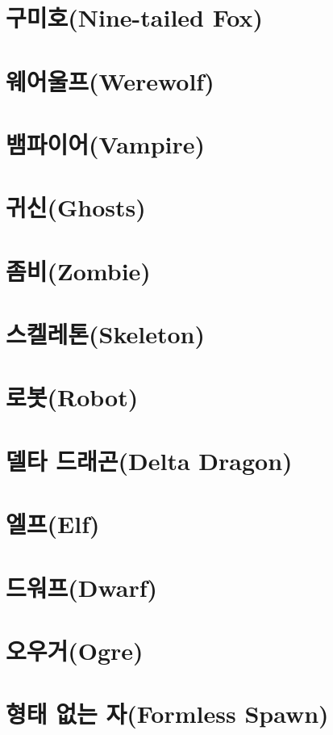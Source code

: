 \documentclass{report}
\begin{document}
	\section{구미호(Nine-tailed Fox)}
		
	
	\section{웨어울프(Werewolf)}
		
	
	\hypertarget{species:vampire}{}
	\section{뱀파이어(Vampire)}
		
	
	\hypertarget{species:ghost}{}
	\section{귀신(Ghosts)}
		
	
	\hypertarget{species:zombie}{}
	\section{좀비(Zombie)}
		
	
	\hypertarget{species:skeleton}{}
	\section{스켈레톤(Skeleton)}
		
		
	\section{로봇(Robot)}
		
	
	\section{델타 드래곤(Delta Dragon)}
		
	
	\section{엘프(Elf)}
		
		
	\section{드워프(Dwarf)}
		
	
	\section{오우거(Ogre)}
		
	
	\section{형태 없는 자(Formless Spawn)}
		
	
\end{document}
